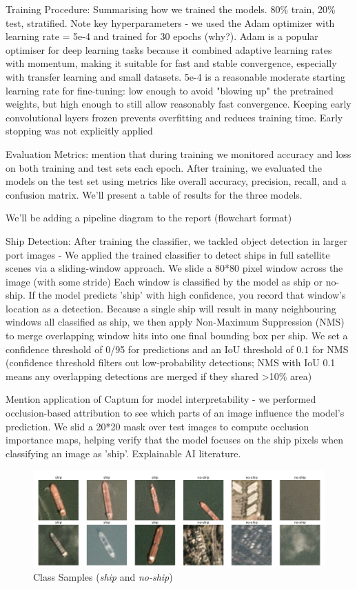 \documentclass[11pt]{article}
\begin{document}
	Training Procedure: Summarising how we trained the models. 80\% train, 20\% test, stratified. Note key hyperparameters - we used the Adam optimizer with learning rate = 5e-4 and trained for 30 epochs (why?). Adam is a popular optimiser for deep learning tasks because it combined adaptive learning rates with momentum, making it suitable for fast and stable convergence, especially with transfer learning and small datasets. 5e-4 is a reasonable moderate starting learning rate for fine-tuning: low enough to avoid "blowing up" the pretrained weights, but high enough to still allow reasonably fast convergence. Keeping early convolutional layers frozen prevents overfitting and reduces training time. Early stopping was not explicitly applied
	
	Evaluation Metrics: mention that during training we monitored accuracy and loss on both training and test sets each epoch. After training, we evaluated the models on the test set using metrics like overall accuracy, precision, recall, and a confusion matrix. We'll present a table of results for the three models.
	
	We'll be adding a pipeline diagram to the report (flowchart format)
	
	Ship Detection: After training the classifier, we tackled object detection in larger port images - We applied the trained classifier to detect ships in full satellite scenes via a sliding-window approach. We slide a 80*80 pixel window across the image (with some stride) Each window is classified by the model as ship or no-ship. If the model predicts 'ship' with high confidence, you record that window's location as a detection. Because a single ship will result in many neighbouring windows all classified as ship, we then apply Non-Maximum Suppression (NMS) to merge overlapping window hits into one final bounding box per ship. We set a confidence threshold of 0/95 for predictions and an IoU threshold of 0.1 for NMS (confidence threshold filters out low-probability detections; NMS with IoU 0.1 means any overlapping detections are merged if they shared >10\% area)
	
	Mention application of Captum for model interpretability - we performed occlusion-based attribution to see which parts of an image influence the model's prediction. We slid a 20*20 mask over test images to compute occlusion importance maps, helping verify that the model focuses on the ship pixels when classifying an image as 'ship'. Explainable AI literature.
	
	\begin{figure}[H]
		\centering
		\caption{Class Samples (\textit{ship} and \textit{no-ship})}
		\includegraphics[width=\linewidth]{assets/data_example/ship_vs_noship_examples.png}
	\end{figure}
	
\end{document}
